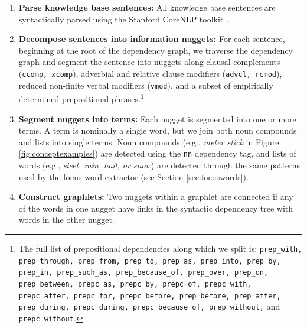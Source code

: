 \begin{enumerate}

\item{\textbf{Parse knowledge base sentences: } 
All knowledge base sentences are syntactically parsed using the Stanford CoreNLP toolkit~\cite{manning2014stanford}.}


\item {\textbf{Decompose sentences into information nuggets: \label{step:creatinggraphlets}} 
For each sentence, beginning at the root of the dependency graph, we traverse the dependency graph and segment the sentence into nuggets along clausal complements ({\tt ccomp, xcomp}), adverbial and relative clause modifiers ({\tt advcl, rcmod}), reduced non-finite verbal modifiers ({\tt vmod}), and a subset of empirically determined prepositional phrases.\footnote{The full list of prepositional dependencies along which we split is: {\tt prep\_with, prep\_through, prep\_from, prep\_to, prep\_as, prep\_into, prep\_by, prep\_in, prep\_such\_as, prep\_because\_of, prep\_over, prep\_on, prep\_between, prepc\_as, prepc\_by, prepc\_of, prepc\_with, prepc\_after, prepc\_for, prepc\_before, prep\_before, prep\_after, prep\_during, prepc\_during, prepc\_because\_of, prep\_without,} and {\tt prepc\_without}.}
}

\item {\textbf{Segment nuggets into terms: }
Each nugget is segmented into one or more terms.  A term is nominally a single word, but we join both noun compounds and lists into single terms.  Noun compounds (e.g., \emph{meter stick} in Figure \ref{fig:conceptexamples}) are detected using the {\tt nn} dependency tag, and lists of words (e.g., \emph{sleet, rain, hail, or snow}) are detected through the same patterns used by the focus word extractor (see Section \ref{sec:focuswords}).
}


\item {\textbf{Construct graphlets:} Two nuggets within a graphlet are connected if any of the words in one nugget have links in the syntactic dependency tree with words in the other nugget. } 


\end{enumerate}
